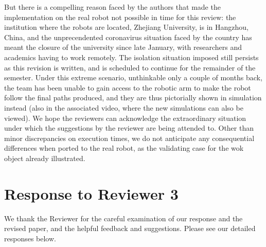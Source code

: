 \documentclass[11pt]{article}
\begin{document}
\begin{enumerate}[I.]
But there is a compelling reason faced by the authors that made the implementation on the real robot not possible in time for this review: the institution where the robots are located, Zhejiang University, is in Hangzhou, China, and the unprecendented coronavirus situation faced by the country has meant the closure of the 
university since late January, with researchers and academics having to work remotely. The isolation situation imposed still persists as this revision is written, and is scheduled to continue for the remainder of the semester.
Under this extreme scenario, unthinkable only a couple of months back, the team has been unable to gain access to the robotic arm to make the robot follow the final paths produced, and they are thus pictorially shown in simulation instead (also in the associated video, where the new simulations can also be viewed). 
We hope the reviewers can acknowledge the extraordinary situation under which the suggestions by the reviewer are being attended to. Other than minor discrepancies on execution times, we do not anticipate any consequential differences when ported to the real robot, as the validating case for the wok object already illustrated.

\end{enumerate}

\clearpage

\section*{Response to Reviewer 3}
We thank the Reviewer for the careful examination of our response and the revised paper, and the helpful feedback and suggestions. Please see our detailed responses below.
\end{document}
